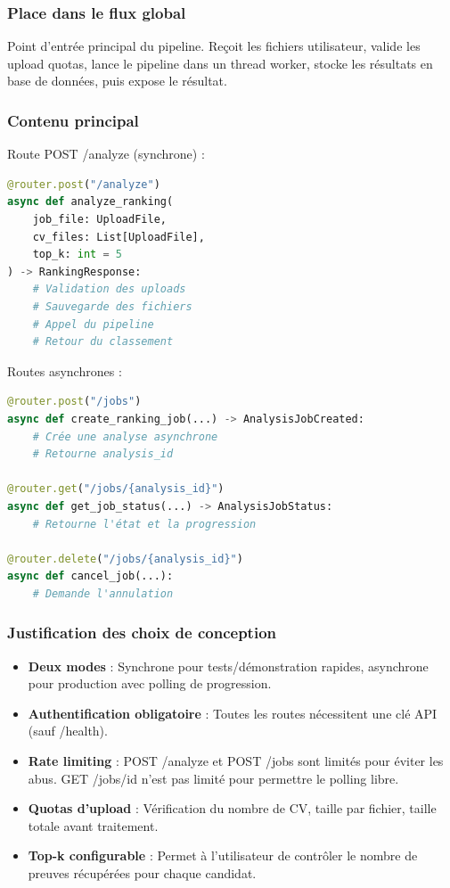 \documentclass[12pt,a4paper,oneside]{book}
\begin{document}
\subsubsection{Place dans le flux global}

Point d'entrée principal du pipeline. Reçoit les fichiers utilisateur, valide les upload quotas, lance le pipeline dans un thread worker, stocke les résultats en base de données, puis expose le résultat.

\subsubsection{Contenu principal}

Route POST /analyze (synchrone) :
\begin{lstlisting}[language=Python]
@router.post("/analyze")
async def analyze_ranking(
    job_file: UploadFile,
    cv_files: List[UploadFile],
    top_k: int = 5
) -> RankingResponse:
    # Validation des uploads
    # Sauvegarde des fichiers
    # Appel du pipeline
    # Retour du classement
\end{lstlisting}

Routes asynchrones :
\begin{lstlisting}[language=Python]
@router.post("/jobs")
async def create_ranking_job(...) -> AnalysisJobCreated:
    # Crée une analyse asynchrone
    # Retourne analysis_id

@router.get("/jobs/{analysis_id}")
async def get_job_status(...) -> AnalysisJobStatus:
    # Retourne l'état et la progression

@router.delete("/jobs/{analysis_id}")
async def cancel_job(...):
    # Demande l'annulation
\end{lstlisting}

\subsubsection{Justification des choix de conception}

\begin{itemize}
    \item \textbf{Deux modes} : Synchrone pour tests/démonstration rapides, asynchrone pour production avec polling de progression.
    
    \item \textbf{Authentification obligatoire} : Toutes les routes nécessitent une clé API (sauf /health).
    
    \item \textbf{Rate limiting} : POST /analyze et POST /jobs sont limités pour éviter les abus. GET /jobs/{id} n'est pas limité pour permettre le polling libre.
    
    \item \textbf{Quotas d'upload} : Vérification du nombre de CV, taille par fichier, taille totale avant traitement.
    
    \item \textbf{Top-k configurable} : Permet à l'utilisateur de contrôler le nombre de preuves récupérées pour chaque candidat.
\end{itemize}
\end{document}
